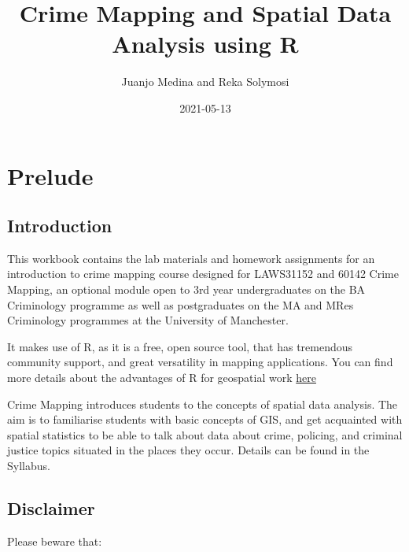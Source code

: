 \documentclass[
]{book}
\title{Crime Mapping and Spatial Data Analysis using R}
\author{Juanjo Medina and Reka Solymosi}
\date{2021-05-13}
\begin{document}
\maketitle

{
\setcounter{tocdepth}{1}
\tableofcontents
}
\hypertarget{prelude}{%
\chapter*{Prelude}\label{prelude}}

\hypertarget{introduction}{%
\section{Introduction}\label{introduction}}

This workbook contains the lab materials and homework assignments for an introduction to crime mapping course designed for LAWS31152 and 60142 Crime Mapping, an optional module open to 3rd year undergraduates on the BA Criminology programme as well as postgraduates on the MA and MRes Criminology programmes at the University of Manchester.

It makes use of R, as it is a free, open source tool, that has tremendous community support, and great versatility in mapping applications. You can find more details about the advantages of R for geospatial work \href{https://geocompr.robinlovelace.net/intro.html}{here}

Crime Mapping introduces students to the concepts of spatial data analysis. The aim is to familiarise students with basic concepts of GIS, and get acquainted with spatial statistics to be able to talk about data about crime, policing, and criminal justice topics situated in the places they occur. Details can be found in the Syllabus.

\hypertarget{disclaimer}{%
\section{Disclaimer}\label{disclaimer}}

Please beware that:
\end{document}
